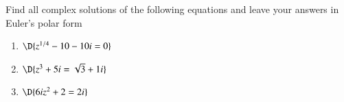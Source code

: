 \documentclass[11pt]{article}
\begin{document}
\vspace{0.2cm}

Find all complex solutions of the following equations and leave your answers in Euler's polar form
\begin{enumerate}
	\item[6.] $\D{z^{1/4}-10-10i = 0}$
	\item[7.] $\D{z^3 + 5i = \sqrt{3}+1i}$
	\item[8.] $\D{6iz^2 + 2 = 2i}$
\end{enumerate}
\end{document}
